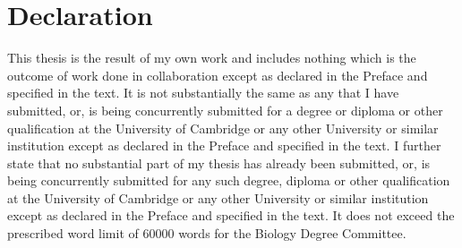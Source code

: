 %
%

\chapter{Declaration}


This thesis is the result of my own work and includes nothing which is the outcome of work done in collaboration except as declared in the Preface and specified in the text. 
It is not substantially the same as any that I have submitted, or, is being concurrently submitted for a degree or diploma or other qualification at the University of Cambridge or any other University or similar institution except as declared in the Preface and specified in the text.
I further state that no substantial part of my thesis has already been submitted, or, is being concurrently submitted for any such degree, diploma or other qualification at the University of Cambridge or any other University or similar institution except as declared in the Preface and specified in the text.
It does not exceed the prescribed word limit of \num{60000} words for the Biology Degree Committee.

